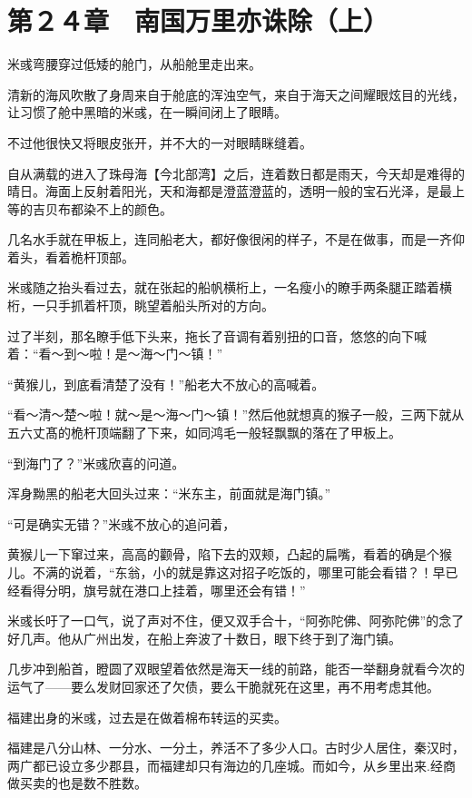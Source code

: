 \section{第２４章　南国万里亦诛除（上）}

米彧弯腰穿过低矮的舱门，从船舱里走出来。

清新的海风吹散了身周来自于舱底的浑浊空气，来自于海天之间耀眼炫目的光线，让习惯了舱中黑暗的米彧，在一瞬间闭上了眼睛。

不过他很快又将眼皮张开，并不大的一对眼睛眯缝着。

自从满载的进入了珠母海【今北部湾】之后，连着数日都是雨天，今天却是难得的晴日。海面上反射着阳光，天和海都是澄蓝澄蓝的，透明一般的宝石光泽，是最上等的吉贝布都染不上的颜色。

几名水手就在甲板上，连同船老大，都好像很闲的样子，不是在做事，而是一齐仰着头，看着桅杆顶部。

米彧随之抬头看过去，就在张起的船帆横桁上，一名瘦小的瞭手两条腿正踏着横桁，一只手抓着杆顶，眺望着船头所对的方向。

过了半刻，那名瞭手低下头来，拖长了音调有着别扭的口音，悠悠的向下喊着：“看～到～啦！是～海～门～镇！”

“黄猴儿，到底看清楚了没有！”船老大不放心的高喊着。

“看～清～楚～啦！就～是～海～门～镇！”然后他就想真的猴子一般，三两下就从五六丈髙的桅杆顶端翻了下来，如同鸿毛一般轻飘飘的落在了甲板上。

“到海门了？”米彧欣喜的问道。

浑身黝黑的船老大回头过来：“米东主，前面就是海门镇。”

“可是确实无错？”米彧不放心的追问着，

黄猴儿一下窜过来，高高的颧骨，陷下去的双颊，凸起的扁嘴，看着的确是个猴儿。不满的说着，“东翁，小的就是靠这对招子吃饭的，哪里可能会看错？！早已经看得分明，旗号就在港口上挂着，哪里还会有错！”

米彧长吁了一口气，说了声对不住，便又双手合十，“阿弥陀佛、阿弥陀佛”的念了好几声。他从广州出发，在船上奔波了十数日，眼下终于到了海门镇。

几步冲到船首，瞪圆了双眼望着依然是海天一线的前路，能否一举翻身就看今次的运气了——要么发财回家还了欠债，要么干脆就死在这里，再不用考虑其他。

福建出身的米彧，过去是在做着棉布转运的买卖。

福建是八分山林、一分水、一分土，养活不了多少人口。古时少人居住，秦汉时，两广都已设立多少郡县，而福建却只有海边的几座城。而如今，从乡里出来.经商做买卖的也是数不胜数。

